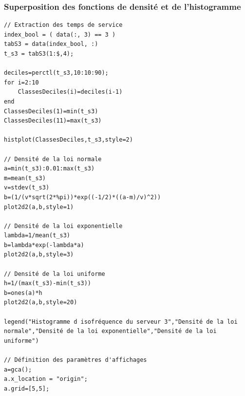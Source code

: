 \documentclass{article}
\begin{document}
\subsubsection{Superposition des fonctions de densité et de l'histogramme}
\begin{verbatim}
// Extraction des temps de service
index_bool = ( data(:, 3) == 3 )
tabS3 = data(index_bool, :)
t_s3 = tabS3(1:$,4);

deciles=perctl(t_s3,10:10:90);
for i=2:10
    ClassesDeciles(i)=deciles(i-1)
end
ClassesDeciles(1)=min(t_s3)
ClassesDeciles(11)=max(t_s3)

histplot(ClassesDeciles,t_s3,style=2)

// Densité de la loi normale
a=min(t_s3):0.01:max(t_s3)
m=mean(t_s3)
v=stdev(t_s3)
b=(1/(v*sqrt(2*%pi))*exp((-1/2)*((a-m)/v)^2))
plot2d2(a,b,style=1)

// Densité de la loi exponentielle
lambda=1/mean(t_s3)
b=lambda*exp(-lambda*a)
plot2d2(a,b,style=3)

// Densité de la loi uniforme
h=1/(max(t_s3)-min(t_s3))
b=ones(a)*h
plot2d2(a,b,style=20)

legend("Histogramme d isofréquence du serveur 3","Densité de la loi
normale","Densité de la loi exponentielle","Densité de la loi uniforme")

// Définition des paramètres d'affichages
a=gca();
a.x_location = "origin";
a.grid=[5,5];


\end{verbatim}



\begin{verbatim}
\end{verbatim}
\end{document}

